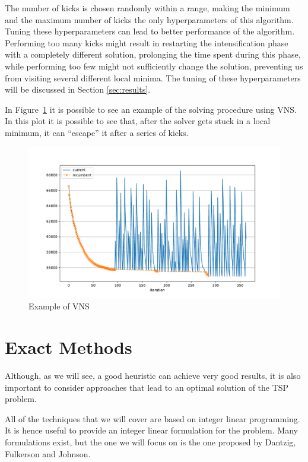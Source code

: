 \documentclass{article}
\begin{document}
The number of kicks is chosen randomly within a range, making the minimum and the maximum number
of kicks the only hyperparameters of this algorithm.
Tuning these hyperparameters can lead to better performance of the algorithm. Performing too many
kicks might result in restarting the intensification phase with a completely different solution,
prolonging the time spent during this phase, while performing
too few might not sufficiently change the solution, preventing us from visiting several different local minima.
The tuning of these hyperparameters will be discussed in Section \ref{sec:results}.

In Figure~\ref{fig:vns} it is possible to see an example of the solving procedure
using VNS. In this plot it is possible to see that, after the solver gets
stuck in a local minimum, it can ``escape'' it after a series of kicks.

\begin{figure}[ht]
        \caption{Example of VNS}
        \label{fig:vns}
        \centering
        \includegraphics[width=400pt]{assets/vns.pdf}
\end{figure}

\clearpage

\section{Exact Methods}
Although, as we will see, a good heuristic can achieve very good results, it is also
important to consider approaches that lead to an optimal solution of the
TSP problem.

All of the techniques that we will cover are based on integer linear programming. It is
hence useful to provide an integer linear formulation for the problem.
Many formulations exist, but the one we will focus on is the one proposed by
Dantzig, Fulkerson and Johnson. %
\end{document}
